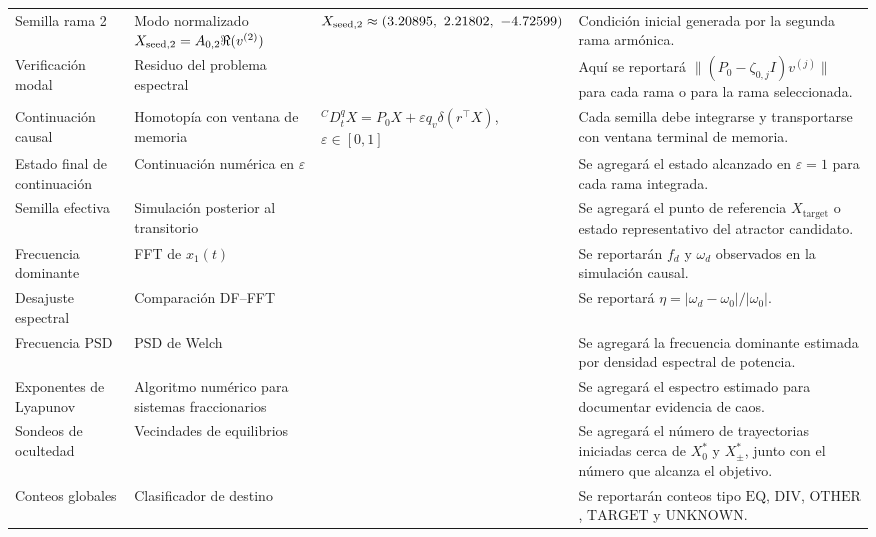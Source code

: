 \documentclass[journal]{IEEEtran}
\begin{document}
\begin{table}[htbp]
\begin{adjustbox}{max width=\textwidth}
\begin{tabular}{@{}L{2.7cm}L{3.4cm}L{4.4cm}L{5.8cm}@{}}
Semilla rama 2 &
Modo normalizado \(X_{{\rm seed},2}=A_{0,2}\Re(v^{(2)})\) &
\(X_{{\rm seed},2}\approx(3.20895,\ 2.21802,\ -4.72599)\) &
Condición inicial generada por la segunda rama armónica. \\

Verificación modal &
Residuo del problema espectral &
 &
Aquí se reportará \(\lVert(P_0-\zeta_{0,j}I)v^{(j)}\rVert\) para cada rama o para la rama seleccionada. \\

Continuación causal &
Homotopía con ventana de memoria &
\({}^{C}D_t^qX=P_0X+\varepsilon q_v\delta(r^\top X)\), \(\varepsilon\in[0,1]\) &
Cada semilla debe integrarse y transportarse con ventana terminal de memoria. \\

Estado final de continuación &
Continuación numérica en \(\varepsilon\) &
 &
Se agregará el estado alcanzado en \(\varepsilon=1\) para cada rama integrada. \\

Semilla efectiva &
Simulación posterior al transitorio &
 &
Se agregará el punto de referencia \(X_{\mathrm{target}}\) o estado representativo del atractor candidato. \\

Frecuencia dominante &
FFT de \(x_1(t)\) &
 &
Se reportarán \(f_d\) y \(\omega_d\) observados en la simulación causal. \\

Desajuste espectral &
Comparación DF--FFT &
 &
Se reportará \(\eta=\lvert\omega_d-\omega_0\rvert/\lvert\omega_0\rvert\). \\

Frecuencia PSD &
PSD de Welch &
 &
Se agregará la frecuencia dominante estimada por densidad espectral de potencia. \\

Exponentes de Lyapunov &
Algoritmo numérico para sistemas fraccionarios &
 &
Se agregará el espectro estimado para documentar evidencia de caos. \\

Sondeos de ocultedad &
Vecindades de equilibrios &
 &
Se agregará el número de trayectorias iniciadas cerca de \(X_0^*\) y \(X_\pm^*\), junto con el número que alcanza el objetivo. \\

Conteos globales &
Clasificador de destino &
 &
Se reportarán conteos tipo \(\mathrm{EQ}\), \(\mathrm{DIV}\), \(\mathrm{OTHER}\), \(\mathrm{TARGET}\) y \(\mathrm{UNKNOWN}\). \\


\end{tabular}
\end{adjustbox}
\end{table}
\end{document}
